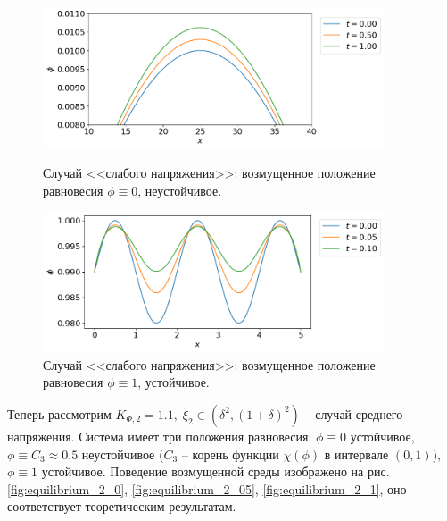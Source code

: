 \begin{figure}[!t]
    \centering
    \includegraphics[width=0.9\textwidth]{figures/equilibrium_1_0.png}
    \vspace{-0.3cm}
    \caption{Случай <<слабого напряжения>>: возмущенное положение равновесия $\phi \equiv 0$, неустойчивое.}
    \label{fig:equilibrium_1_0}
    \vspace{0.5cm}
    
    \includegraphics[width=0.9\textwidth]{figures/equilibrium_1_1.png}
    \vspace{-0.3cm}
    \caption{Случай <<слабого напряжения>>: возмущенное положение равновесия $\phi \equiv 1$, устойчивое.}
    \label{fig:equilibrium_1_1}
\end{figure}

Теперь рассмотрим $K_{\Phi, 2} = 1.1, \; \xi_2 \in (\delta^2, (1 + \delta)^2)$ -- случай среднего напряжения. Система имеет три положения равновесия: $\phi \equiv 0$ устойчивое, $\phi \equiv C_3 \approx 0.5$ неустойчивое ($C_3$ -- корень функции $\chi(\phi)$ в интервале $(0, 1)$), $\phi \equiv 1$ устойчивое. Поведение возмущенной среды изображено на рис. \ref{fig:equilibrium_2_0}, \ref{fig:equilibrium_2_05}, \ref{fig:equilibrium_2_1}, оно соответствует теоретическим результатам.


